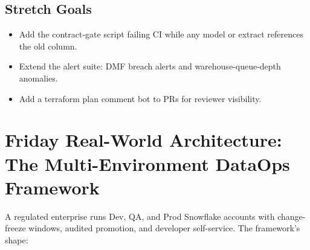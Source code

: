 \subsection*{Stretch Goals}
\begin{itemize}
    \item Add the contract-gate script failing CI while any model or extract references the old column.
    \item Extend the alert suite: DMF breach alerts and warehouse-queue-depth anomalies.
    \item Add a terraform plan comment bot to PRs for reviewer visibility.
\end{itemize}

\section{Friday Real-World Architecture: The Multi-Environment DataOps Framework}
A regulated enterprise runs Dev, QA, and Prod Snowflake accounts with change-freeze windows, audited promotion, and developer self-service. The framework's shape:

